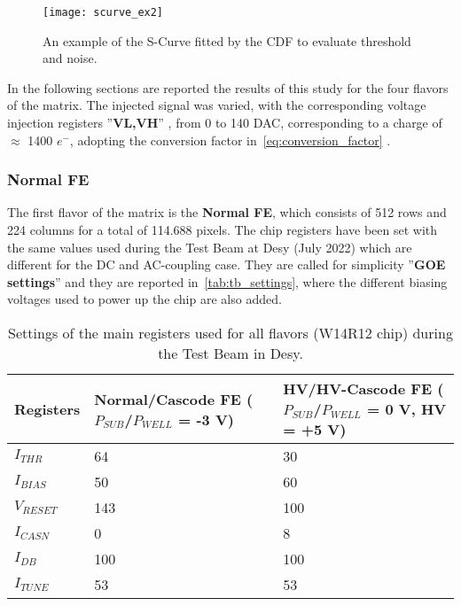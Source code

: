 \begin{figure}
\centering
\texttt{[image: scurve\_ex2]}
\caption{An example of the S-Curve fitted by the CDF to evaluate threshold and noise.}
\label{fig:ex_scurve}
\end{figure}

In the following sections are reported the results of this study for the four flavors of the matrix. The injected signal was varied, with the corresponding voltage injection registers ''\textbf{VL,VH}'' , from 0 to 140 DAC, corresponding to a charge of $\approx$ 1400 $e^{-}$, adopting the conversion factor in~\autoref{eq:conversion_factor} .


\subsubsection{Normal FE}

The first flavor of the matrix is the \textbf{Normal FE}, which consists of 512 rows and 224 columns for a total of 114.688 pixels. The chip registers have been set with the same values used during the Test Beam at Desy (July 2022) which are different for the DC and AC-coupling case. They are called for simplicity ''\textbf{GOE settings}'' and they are reported in~\autoref{tab:tb_settings}, where the different biasing voltages used to power up the chip are also added.

\begin{table}[h!]
\centering
\begin{tabular}{C{3.2cm}|C{3.7cm}|C{3.5cm}}
Registers & Normal/Cascode FE ($P_{SUB}$/$P_{WELL}$ = -3 V) & HV/HV-Cascode FE ($P_{SUB}$/$P_{WELL}$ = 0 V, HV = +5 V)\\[2ex]
\hline
\hline
$I_{THR}$ & 64 & 30\\[0.5ex]
\hline
$I_{BIAS}$ & 50 & 60\\
\hline
$V_{RESET}$ & 143 & 100\\
\hline
$I_{CASN}$ & 0 & 8\\
\hline
$I_{DB}$ & 100 & 100\\
\hline
$I_{TUNE}$ & 53 & 53\\
\hline
\hline
\end{tabular}
\caption{Settings of the main registers used for all flavors (W14R12 chip) during the Test Beam in Desy.}
\label{tab:tb_settings}
\end{table}


